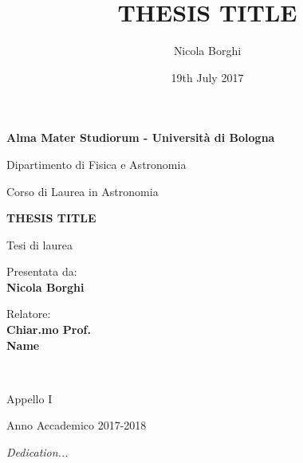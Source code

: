 \documentclass[12pt,a4paper]{report}
\newcommand{\ag}{\`a}
\begin{document}
\title{THESIS TITLE}
\author{Nicola Borghi}
\date{19th July 2017}

\begin{titlepage}
    \begin{center}
        \vspace*{0.2cm}
        {\fontsize{19pt}{20pt}\selectfont \textbf{Alma Mater Studiorum - Universit{\ag} di Bologna}\par}
    
        \noindent\hrulefill
        \vspace{0.8cm}
        
        \Large
        
        Dipartimento di Fisica e Astronomia
        
        Corso di Laurea in Astronomia
        
        \Large
        \vspace{5cm}
        {\fontsize{22.5pt}{22.5}\textcolor{MyDarkBlue}{\textbf{THESIS TITLE}}}

        
        \vspace{1cm}
        {\fontsize{16pt}{16pt}Tesi di laurea}
        
        \vspace{4.5cm}
        \begin{minipage}[t]{0.34\textwidth}
        \begin{flushleft}
        {\fontsize{16pt}{16pt}Presentata da: \\ \textbf{\textcolor{MyDarkBlue}{Nicola Borghi}}}
        \end{flushleft}
        \end{minipage}
        \begin{minipage}[t]{0.64\textwidth}
        \begin{flushright} \Large
        Relatore: \\
        \textbf{\textcolor{MyDarkBlue}{Chiar.mo Prof.}} \\ \textbf{\textcolor{MyDarkBlue}{Name}} 
        \end{flushright}
        \end{minipage}\\
        
        \vfill
        \noindent\hrulefill
        \vspace{0.3cm}
        \Large
        
        Appello {\textcolor{MyDarkBlue} {I}} 
        
        Anno Accademico {\textcolor{MyDarkBlue} {2017-2018}}
    \end{center}
\end{titlepage}
\restoregeometry
\vspace*{5cm}
\begin{flushright}
  {\parbox{4.2cm}{\textit{Dedication...}}}
\end{flushright}
\end{document}
